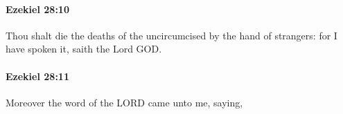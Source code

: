 		\paragraph{Ezekiel 28:10} %
			\label{EZEKIEL-28-10}

			Thou shalt die the deaths of the uncircumcised by the hand of strangers: for I have spoken it, saith the Lord GOD.


		\paragraph{Ezekiel 28:11} %
			\label{EZEKIEL-28-11}

			Moreover the word of the LORD came unto me, saying,


